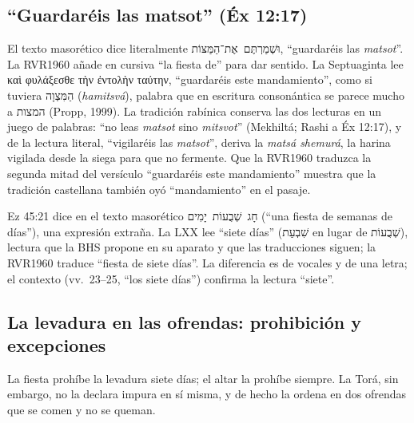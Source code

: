 \documentclass[11pt,letterpaper]{article}
\newcommand{\heb}[1]{\mbox{\foreignlanguage{hebrew}{#1}}}
\newcommand{\grc}[1]{\foreignlanguage{ancientgreek}{#1}}
\begin{document}
\subsection{``Guardaréis las matsot'' (Éx 12:17)}
El texto masorético dice literalmente \heb{וּשְׁמַרְתֶּם אֶת־הַמַּצּוֹת}, ``guardaréis las \emph{matsot}''. La RVR1960 añade en cursiva ``la fiesta de'' para dar sentido. La Septuaginta lee \grc{καὶ φυλάξεσθε τὴν ἐντολὴν ταύτην}, ``guardaréis este mandamiento'', como si tuviera \heb{הַמִּצְוָה} (\emph{hamitsvá}), palabra que en escritura consonántica se parece mucho a \heb{המצות} (Propp, 1999). La tradición rabínica conserva las dos lecturas en un juego de palabras: ``no leas \emph{matsot} sino \emph{mitsvot}'' (Mekhiltá; Rashi a Éx 12:17), y de la lectura literal, ``vigilaréis las \emph{matsot}'', deriva la \emph{matsá shemurá}, la harina vigilada desde la siega para que no fermente. Que la RVR1960 traduzca la segunda mitad del versículo ``guardaréis este mandamiento'' muestra que la tradición castellana también oyó ``mandamiento'' en el pasaje.

\begin{nota}
Ez 45:21 dice en el texto masorético \heb{חָג שְׁבֻעוֹת יָמִים} (``una fiesta de semanas de días''), una expresión extraña. La LXX lee ``siete días'' (\heb{שִׁבְעַת} en lugar de \heb{שְׁבֻעוֹת}), lectura que la BHS propone en su aparato y que las traducciones siguen; la RVR1960 traduce ``fiesta de siete días''. La diferencia es de vocales y de una letra; el contexto (vv.~23--25, ``los siete días'') confirma la lectura ``siete''.
\end{nota}

\subsection{La levadura en las ofrendas: prohibición y excepciones}
La fiesta prohíbe la levadura siete días; el altar la prohíbe siempre. La Torá, sin embargo, no la declara impura en sí misma, y de hecho la ordena en dos ofrendas que se comen y no se queman.
\end{document}
